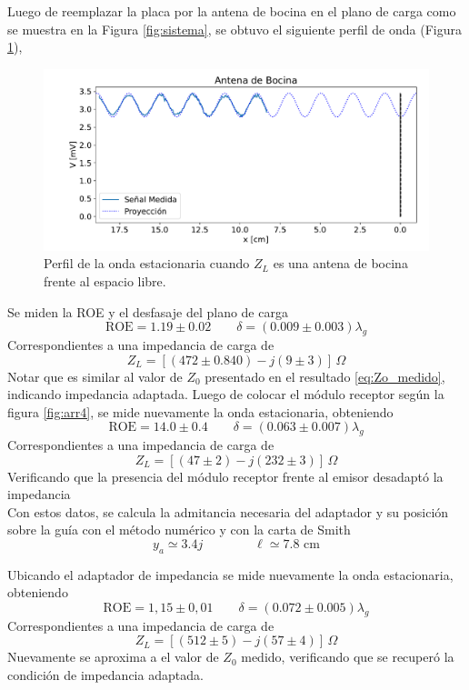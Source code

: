 \documentclass[11pt,a4paper]{article}
\begin{document}
\begin{multicols}{2}
Luego de reemplazar la placa por la antena de bocina en el plano de carga como se muestra en la Figura \ref{fig:sistema}, se obtuvo el siguiente perfil de onda (Figura \ref{fig:bocina}),
\begin{figure}[H]
    \centering
    \includegraphics[width=\linewidth]{Images/antena_bocina.pdf}
    \caption{Perfil de la onda estacionaria cuando $Z_L$ es una antena de bocina frente al espacio libre.}
    \label{fig:bocina}
\end{figure}
Se miden la ROE y el desfasaje del plano de carga
$$
\text{ROE} = 1.19 \pm 0.02  \qquad \delta = (0.009 \pm 0.003)\lambda_g
$$
Correspondientes a una impedancia de carga de
$$
Z_L = \left[(472 \pm 0.840) - j (9 \pm 3)\right] \,\Omega
$$
Notar que es similar al valor de $Z_0$ presentado en el resultado \ref{eq:Zo_medido}, indicando impedancia adaptada. Luego de colocar el módulo receptor según la figura \ref{fig:arr4}, se mide nuevamente la onda estacionaria, obteniendo
$$
\text{ROE} = 14.0\pm0.4 \qquad \delta = (0.063 \pm 0.007)\lambda_g
$$
Correspondientes a una impedancia de carga de
$$
Z_L = \left[(47\pm2) - j (232 \pm 3)\right]\,\Omega
$$
Verificando que la presencia del módulo receptor frente al emisor desadaptó la impedancia\\

Con estos datos, se calcula la admitancia necesaria del adaptador y su posición sobre la guía con el método numérico y con la carta de Smith
$$
y_a \simeq 3.4j \qquad\qquad \ell \simeq 7.8 \text{ cm}
$$

Ubicando el adaptador de impedancia se mide nuevamente la onda estacionaria, obteniendo
$$
\text{ROE} = 1,15 \pm 0,01 \qquad \delta = (0.072 \pm 0.005)\lambda_g
$$
Correspondientes a una impedancia de carga de
$$
Z_L = \left[(512\pm5) - j (57 \pm 4)\right]\,\Omega
$$
Nuevamente se aproxima a el valor de $Z_0$ medido, verificando que se recuperó la condición de impedancia adaptada.\\


\end{multicols}
\end{document}
